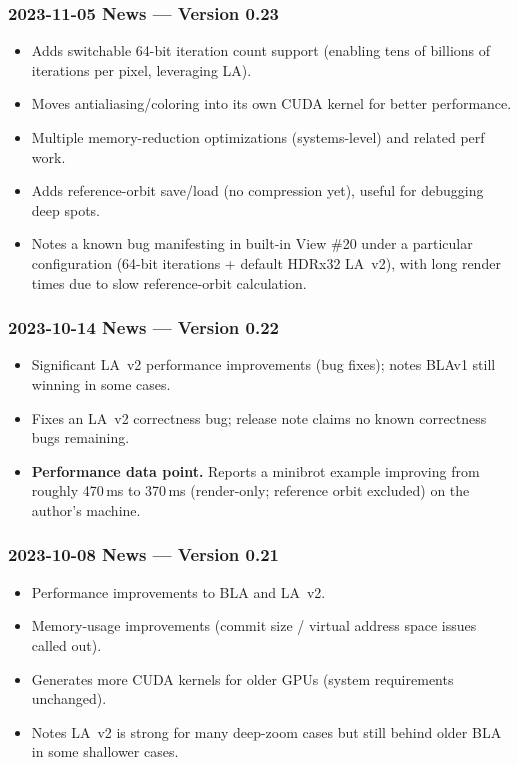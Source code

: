 \subsubsection{2023-11-05 News --- Version 0.23}
\begin{itemize}
  \item Adds switchable 64-bit iteration count support (enabling tens of
  billions of iterations per pixel, leveraging LA).
  \item Moves antialiasing/coloring into its own CUDA kernel for better
  performance.
  \item Multiple memory-reduction optimizations (systems-level) and related perf
  work.
  \item Adds reference-orbit save/load (no compression yet), useful for
  debugging deep spots.
  \item Notes a known bug manifesting in built-in View \#20 under a particular
  configuration (64-bit iterations + default HDRx32 LA~v2), with long render
  times due to slow reference-orbit calculation.
\end{itemize}


\subsubsection{2023-10-14 News --- Version 0.22}

\begin{itemize}

  \item Significant LA~v2 performance improvements (bug fixes); notes BLAv1 still
  winning in some cases.

  \item Fixes an LA~v2 correctness bug; release note claims no known correctness
  bugs remaining.

  \item \textbf{Performance data point.} Reports a minibrot example improving
  from roughly 470\,ms to 370\,ms (render-only; reference orbit excluded) on the
  author’s machine.

\end{itemize}


\subsubsection{2023-10-08 News --- Version 0.21}
\begin{itemize}
  \item Performance improvements to BLA and LA~v2.
  \item Memory-usage improvements (commit size / virtual address space issues
  called out).
  \item Generates more CUDA kernels for older GPUs (system requirements
  unchanged).
  \item Notes LA~v2 is strong for many deep-zoom cases but still behind older BLA
  in some shallower cases.
\end{itemize}



